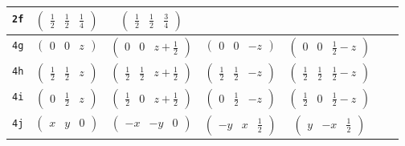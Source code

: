 \documentclass[fleqn,9pt,landscape]{jsarticle}
\begin{document}
\begin{center}
\begin{longtable}{ccccccc}
{\tt 2f} & $ \begin{pmatrix} \frac{1}{2} & \frac{1}{2} & \frac{1}{4} \end{pmatrix} $ & $ \begin{pmatrix} \frac{1}{2} & \frac{1}{2} & \frac{3}{4} \end{pmatrix} $ & $  $ & $  $ & $  $ & $  $ \\ \hline
{\tt 4g} & $ \begin{pmatrix} 0 & 0 & z \end{pmatrix} $ & $ \begin{pmatrix} 0 & 0 & z + \frac{1}{2} \end{pmatrix} $ & $ \begin{pmatrix} 0 & 0 & - z \end{pmatrix} $ & $ \begin{pmatrix} 0 & 0 & \frac{1}{2} - z \end{pmatrix} $ & $  $ & $  $ \\ \hline
{\tt 4h} & $ \begin{pmatrix} \frac{1}{2} & \frac{1}{2} & z \end{pmatrix} $ & $ \begin{pmatrix} \frac{1}{2} & \frac{1}{2} & z + \frac{1}{2} \end{pmatrix} $ & $ \begin{pmatrix} \frac{1}{2} & \frac{1}{2} & - z \end{pmatrix} $ & $ \begin{pmatrix} \frac{1}{2} & \frac{1}{2} & \frac{1}{2} - z \end{pmatrix} $ & $  $ & $  $ \\ \hline
{\tt 4i} & $ \begin{pmatrix} 0 & \frac{1}{2} & z \end{pmatrix} $ & $ \begin{pmatrix} \frac{1}{2} & 0 & z + \frac{1}{2} \end{pmatrix} $ & $ \begin{pmatrix} 0 & \frac{1}{2} & - z \end{pmatrix} $ & $ \begin{pmatrix} \frac{1}{2} & 0 & \frac{1}{2} - z \end{pmatrix} $ & $  $ & $  $ \\ \hline
{\tt 4j} & $ \begin{pmatrix} x & y & 0 \end{pmatrix} $ & $ \begin{pmatrix} - x & - y & 0 \end{pmatrix} $ & $ \begin{pmatrix} - y & x & \frac{1}{2} \end{pmatrix} $ & $ \begin{pmatrix} y & - x & \frac{1}{2} \end{pmatrix} $ & $  $ & $  $ \\ \hline

\end{longtable}
\end{center}
\end{document}
